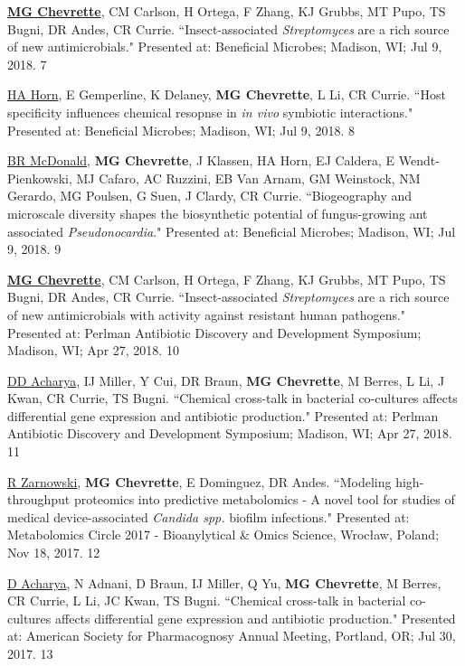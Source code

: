 \begin{cvpubs}
\cvpub
{\underline{\textbf{MG Chevrette}}, CM Carlson, H Ortega, F Zhang, KJ Grubbs, MT Pupo, TS Bugni, DR Andes, CR Currie. ``Insect-associated \textit{Streptomyces} are a rich source of new antimicrobials." Presented at: Beneficial Microbes; Madison, WI; Jul 9, 2018.}
{7}

\cvpub
{\underline{HA Horn}, E Gemperline, K Delaney, \textbf{MG Chevrette}, L Li, CR Currie. ``Host specificity influences chemical resopnse in \textit{in vivo} symbiotic interactions." Presented at: Beneficial Microbes; Madison, WI; Jul 9, 2018.}
{8}

\cvpub
{\underline{BR McDonald}, \textbf{MG Chevrette}, J Klassen, HA Horn, EJ Caldera, E Wendt-Pienkowski, MJ Cafaro, AC Ruzzini, EB Van Arnam, GM Weinstock, NM Gerardo, MG Poulsen, G Suen, J Clardy, CR Currie. ``Biogeography and microscale diversity shapes the biosynthetic potential of fungus-growing ant associated \textit{Pseudonocardia}." Presented at: Beneficial Microbes; Madison, WI; Jul 9, 2018.}
{9}

\cvpub
{\underline{\textbf{MG Chevrette}}, CM Carlson, H Ortega, F Zhang, KJ Grubbs, MT Pupo, TS Bugni, DR Andes, CR Currie. ``Insect-associated \textit{Streptomyces} are a rich source of new antimicrobials with activity against resistant human pathogens." Presented at: Perlman Antibiotic Discovery and Development Symposium; Madison, WI; Apr 27, 2018.}
{10}

\cvpub
{\underline{DD Acharya}, IJ Miller, Y Cui, DR Braun, \textbf{MG Chevrette}, M Berres, L Li, J Kwan, CR Currie, TS Bugni. ``Chemical cross-talk in bacterial co-cultures affects differential gene expression and antibiotic production." Presented at: Perlman Antibiotic Discovery and Development Symposium; Madison, WI; Apr 27, 2018.}
{11}

\cvpub
{\underline{R Zarnowski}, \textbf{MG Chevrette}, E Dominguez, DR Andes. ``Modeling high-throughput proteomics into predictive metabolomics - A novel tool for studies of medical device-associated \textit{Candida spp.} biofilm infections." Presented at: Metabolomics Circle 2017 - Bioanylytical \& Omics Science, Wrocław, Poland; Nov 18, 2017.}
{12}

\cvpub
{\underline{D Acharya}, N Adnani, D Braun, IJ Miller, Q Yu, \textbf{MG Chevrette}, M Berres, CR Currie, L Li, JC Kwan, TS Bugni. ``Chemical cross-talk in bacterial co-cultures affects differential gene expression and antibiotic production." Presented at: American Society for Pharmacognosy Annual Meeting, Portland, OR; Jul 30, 2017.}
{13}


\end{cvpubs}
